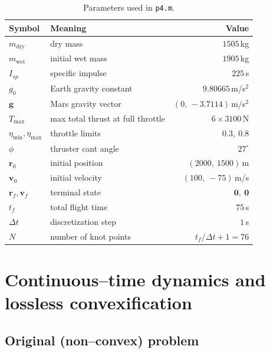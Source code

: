 \documentclass[11pt]{article}
\newcommand{\bv}[1]{\bm{#1}}
\begin{document}
\begin{table}[h]
\centering
\begin{tabular}{llr}
\toprule
Symbol & Meaning & Value \\
\midrule
$m_{\text{dry}}$ & dry mass                         & $1505$\,kg \\
$m_{\text{wet}}$ & initial wet mass                 & $1905$\,kg \\
$I_{sp}$         & specific impulse                 & $225$\,s \\
$g_0$            & Earth gravity constant           & $9.80665$\,m/s$^2$ \\
$\bv g$          & Mars gravity vector              & $(0,\,-3.7114)$\,m/s$^2$ \\
$T_{\max}$       & max total thrust at full throttle& $6\times 3100$\,N \\
$\eta_{\min},\eta_{\max}$ & throttle limits          & $0.3,\ 0.8$ \\
$\phi$           & thruster cant angle              & $27^\circ$ \\
$\bv r_0$        & initial position                 & $(2000,\ 1500)$\,m \\
$\bv v_0$        & initial velocity                 & $(100,\ -75)$\,m/s \\
$\bv r_f,\bv v_f$& terminal state                   & $\bv 0,\ \bv 0$ \\
$t_f$            & total flight time                & $75$\,s \\
$\Delta t$       & discretization step              & $1$\,s \\
$N$              & number of knot points            & $t_f/\Delta t + 1 = 76$ \\
\bottomrule
\end{tabular}
\caption{Parameters used in \texttt{p4.m}.}
\label{tab:params}
\end{table}

\section{Continuous--time dynamics and lossless convexification}

\subsection{Original (non--convex) problem}
\end{document}
